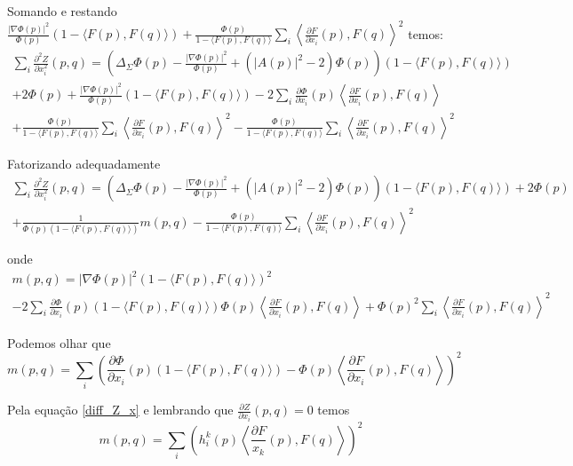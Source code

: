 \begin{demonstracao}
	Somando e restando $\frac{|\nabla \Phi(p)|^2}{\Phi(p)} (1 - \langle F(p), F(q) \rangle) + \frac{\Phi(p)}{1 - \langle F(p),F(q) \rangle} \sum_i \left\langle \frac{\partial F}{\partial x_i} (p), F(q) \right\rangle^2$ temos:
	\begin{multline*}
		\sum_i \frac{\partial^2 Z}{\partial x_i^2}(p,q) = \left(\Delta_{\Sigma} \Phi(p) - \frac{|\nabla \Phi(p)|^2}{\Phi(p)} + (|A(p)|^2 - 2)\Phi(p)\right)(1 - \langle F(p), F(q) \rangle)\\
		+ 2 \Phi(p) + \frac{|\nabla \Phi(p)|^2}{\Phi(p)} (1 - \langle F(p), F(q) \rangle) - 2 \sum_i \frac{\partial \Phi}{\partial x_i}(p) \left\langle \frac{\partial F}{\partial x_i}(p), F(q) \right\rangle\\
		+ \frac{\Phi(p)}{1 - \langle F(p),F(q) \rangle} \sum_i \left\langle \frac{\partial F}{\partial x_i} (p), F(q) \right\rangle^2 - \frac{\Phi(p)}{1 - \langle F(p),F(q) \rangle} \sum_i \left\langle \frac{\partial F}{\partial x_i} (p), F(q) \right\rangle^2
	\end{multline*}
	
	Fatorizando adequadamente
	\begin{multline*}
		\sum_i \frac{\partial^2 Z}{\partial x_i^2}(p,q) = \left(\Delta_{\Sigma} \Phi(p) - \frac{|\nabla \Phi(p)|^2}{\Phi(p)} + (|A(p)|^2 - 2)\Phi(p)\right)(1 - \langle F(p), F(q) \rangle)+ 2 \Phi(p)	\\
		+ \frac{1}{\Phi(p)(1 - \langle F(p), F(q) \rangle)}	m(p,q) - \frac{\Phi(p)}{1 - \langle F(p),F(q) \rangle} \sum_i \left\langle \frac{\partial F}{\partial x_i} (p), F(q) \right\rangle^2
	\end{multline*}
	
	onde
	\begin{multline*}
		m(p,q) = |\nabla \Phi(p)|^2 (1 - \langle F(p), F(q) \rangle)^2 \\
		- 2 \sum_i \frac{\partial \Phi}{\partial x_i}(p) (1 - \langle F(p), F(q) \rangle) \Phi(p) \left\langle \frac{\partial F}{\partial x_i}(p), F(q) \right\rangle + \Phi(p)^2 \sum_i \left\langle \frac{\partial F}{\partial x_i} (p), F(q) \right\rangle^2
	\end{multline*}
	
	Podemos olhar que
	\begin{equation*}
		m(p,q) = \sum_i \left(  \frac{\partial \Phi}{\partial x_i}(p)(1 - \langle F(p),F(q) \rangle) - \Phi(p) \left\langle \frac{\partial F}{\partial x_i}(p), F(q) \right\rangle \right)^2
	\end{equation*}
	
	Pela equação \ref{diff_Z_x} e lembrando que $\frac{\partial Z}{\partial x_i}(p,q)=0$ temos
	\begin{equation*}
		m(p,q) = \sum_i \left( h_i^k(p) \left\langle \frac{\partial F}{x_k}(p), F(q) \right\rangle \right)^2
	\end{equation*}
	

\end{demonstracao}
